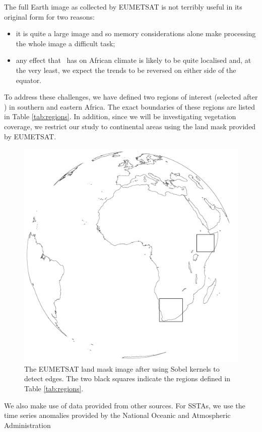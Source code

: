 The full Earth image as collected by EUMETSAT is not terribly useful
in its original form for two reasons:
\begin{itemize}
  \item{it is quite a large
    image and so memory considerations alone make processing the whole
    image a difficult task;}
  \item{any effect that \elnino\ has on African climate is likely to be
    quite localised and, at the very least, we expect the trends to be
    reversed on either side of the equator.}
\end{itemize}
To address these challenges, we have defined two regions of interest
(selected after \cite{anyamba1996, anyamba2002}) in southern and
eastern Africa. The exact boundaries of these regions are listed in
Table \ref{tab:regions}. In addition, since we will be investigating
vegetation coverage, we restrict our study to continental areas using
the land mask provided by EUMETSAT.
\begin{figure}
  \centering
  \includegraphics[width=0.9\linewidth]{figures/regions_figure}
  \caption{The EUMETSAT land mask image after using Sobel kernels to
    detect edges. The two black squares indicate the regions defined
    in Table \ref{tab:regions}.}
  \label{fig:regions}
\end{figure}
We also make use of data provided from other sources. For SSTAs, we use the time
series anomalies provided by the National Oceanic and Atmospheric Administration
